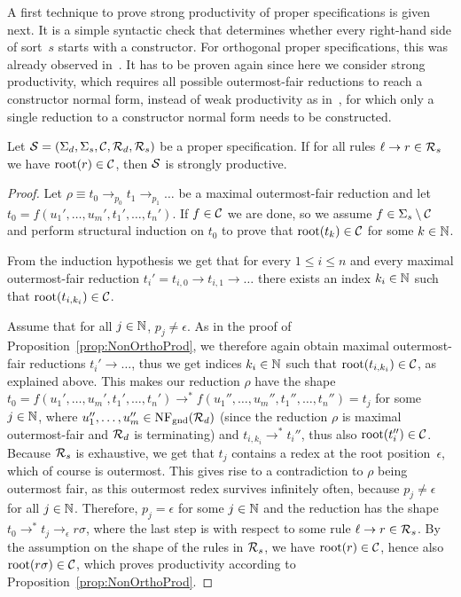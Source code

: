 \documentclass{eptcs}
\begin{document}
A first technique to prove strong productivity of proper specifications is given
next. It is a simple syntactic check that determines whether every right-hand
side of sort~$s$ starts with a constructor. For orthogonal proper
specifications, this was already observed in~\cite{ZR10}. It has to be proven
again since here we consider strong productivity, which requires all possible
outermost-fair reductions to reach a constructor normal form, instead of weak
productivity as in~\cite{ZR10}, for which only a single reduction to a
constructor normal form needs to be constructed.

\begin{theorem}
\label{thm:SyntacticCheck}
Let $\mathcal{S} = (\Sigma_d,\Sigma_s,\mathcal{C},\mathcal{R}_d,\mathcal{R}_s)$ be a proper specification.
If for all rules $\ell \to r \in \mathcal{R}_s$ we have $\mathrm{root}(r) \in \mathcal{C}$, then $\mathcal{S}$ is
strongly productive.
\end{theorem}

\begin{proof}
Let $\rho \equiv t_0 \to_{p_0} t_1 \to_{p_1} \dots$ be a maximal outermost-fair
reduction and let $t_0 = f(u_1', \dotsc, u_m', t_1', \dotsc, t_n')$.
If $f \in \mathcal{C}$ we are done, so we assume $f \in \Sigma_s \setminus \mathcal{C}$ and
perform structural induction on $t_0$ to prove that $\mathrm{root}(t_k) \in \mathcal{C}$ for some
$k \in \mathbb{N}$.

From the induction hypothesis we get that for every $1 \le i \le n$ and every
maximal outermost-fair reduction $t_i' = t_{i,0} \to t_{i,1} \to \dots$ there
exists an index $k_i \in \mathbb{N}$ such that $\mathrm{root}(t_{i,k_i}) \in \mathcal{C}$.

Assume that for all $j \in \mathbb{N}$, $p_j \ne \epsilon$.
As in the proof of Proposition~\ref{prop:NonOrthoProd}, we therefore again
obtain maximal outermost-fair reductions $t_i' \to \dots$, thus we get indices
$k_i \in \mathbb{N}$ such that $\mathrm{root}(t_{i,k_i}) \in \mathcal{C}$, as explained above. This
makes our reduction $\rho$ have the shape
$t_0 = f(u_1', \dotsc, u_m', t_1', \dotsc, t_n') \to^*
f(u_1'', \dotsc, u_m'', t_1'', \dotsc, t_n'') = t_j$ for some $j \in \mathbb{N}$,
where $u_1'', \dotsc, u_m'' \in \mathrm{NF}_{\mathrm{gnd}}(\mathcal{R}_d)$ (since the reduction $\rho$ is
maximal outermost-fair and $\mathcal{R}_d$ is terminating) and
$t_{i,k_i} \to^* t_i''$, thus also $\mathrm{root}(t_i'') \in \mathcal{C}$. Because $\mathcal{R}_s$ is
exhaustive, we get that $t_j$ contains a redex at the root position~$\epsilon$,
which of course is outermost. This gives rise to a contradiction to $\rho$ being
outermost fair, as this outermost redex survives infinitely often, because
$p_j \ne \epsilon$ for all $j \in \mathbb{N}$. Therefore, $p_j = \epsilon$ for some
$j \in \mathbb{N}$ and the reduction has the shape $t_0 \to^* t_j \to_{\epsilon}
r\sigma$, where the last step is with respect to some rule
$\ell \to r \in \mathcal{R}_s$.
By the assumption on the shape of the rules in $\mathcal{R}_s$, we have $\mathrm{root}(r) \in \mathcal{C}$,
hence also $\mathrm{root}(r\sigma) \in \mathcal{C}$, which proves productivity according to
Proposition~\ref{prop:NonOrthoProd}.
\end{proof}
\end{document}
